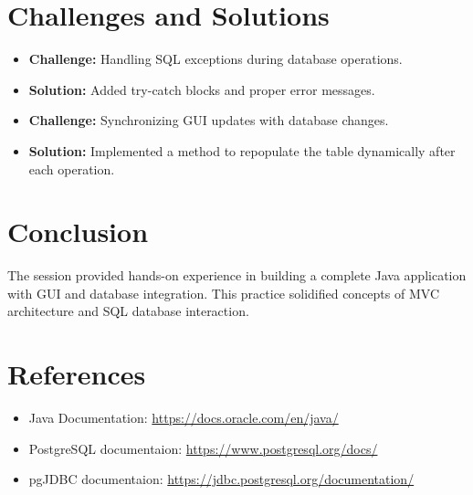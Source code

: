 \documentclass[12pt]{article}
\begin{document}
\section{Challenges and Solutions}
\begin{itemize}
    \item \textbf{Challenge:} Handling SQL exceptions during database
		operations.
    \item \textbf{Solution:} Added try-catch blocks and proper error messages.
    \item \textbf{Challenge:} Synchronizing GUI updates with database changes.
    \item \textbf{Solution:} Implemented a method to repopulate the table
		dynamically after each operation.
\end{itemize}

\section{Conclusion}
The session provided hands-on experience in building a complete Java
application with GUI and database integration. This practice solidified
concepts of MVC architecture and SQL database interaction.

\section{References}
\begin{itemize}
    \item Java Documentation: \url{https://docs.oracle.com/en/java/}
    \item PostgreSQL documentaion: \url{https://www.postgresql.org/docs/}
    \item pgJDBC documentaion: \url{https://jdbc.postgresql.org/documentation/}
\end{itemize}
\end{document}

